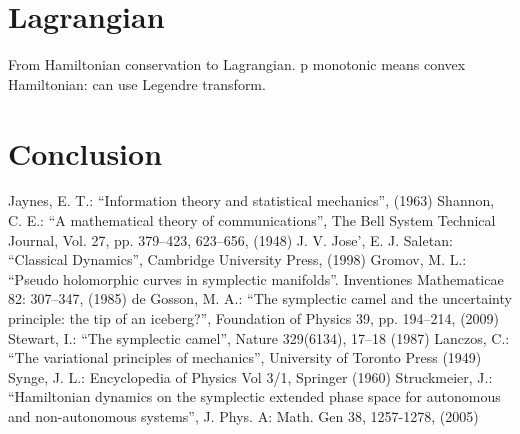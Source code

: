 \documentclass[aps,pra,10pt,twocolumn,floatfix,nofootinbib]{revtex4-1}
\theoremstyle{definition}
\begin{document}
\section{Lagrangian}

From Hamiltonian conservation to Lagrangian. p monotonic means convex Hamiltonian: can use Legendre transform.

\section{Conclusion}

\begin{thebibliography}{0}

 Jaynes, E. T.: ``Information theory and statistical mechanics'', (1963)
 Shannon, C. E.: ``A mathematical theory of communications'', The Bell System Technical Journal, Vol. 27, pp. 379–423, 623–656, (1948)
 J. V. Jose', E. J. Saletan: ``Classical Dynamics'', Cambridge University Press, (1998)
 Gromov, M. L.: ``Pseudo holomorphic curves in symplectic manifolds''. Inventiones Mathematicae 82: 307–347, (1985)
 de Gosson, M. A.: ``The symplectic camel and the uncertainty principle: the tip of an iceberg?'', Foundation of Physics 39, pp. 194–214, (2009)
 Stewart, I.: ``The symplectic camel'', Nature 329(6134), 17–18 (1987)
 Lanczos, C.: ``The variational principles of mechanics'', University of Toronto Press (1949)
 Synge, J. L.: Encyclopedia of Physics Vol 3/1, Springer (1960)
 Struckmeier, J.: ``Hamiltonian dynamics on the symplectic extended phase space for autonomous and non-autonomous systems'', J. Phys. A: Math. Gen 38, 1257-1278, (2005)

\end{thebibliography}
\end{document}
